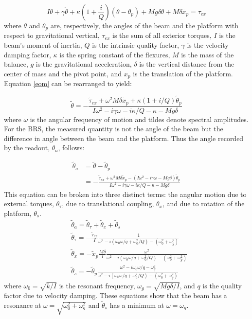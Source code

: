 \documentclass [12pt, proquest]{uwthesis}[2019]
\begin{document}
\begin{equation}
I \ddot{\theta}+ \gamma \dot{\theta}+\kappa (1+ \frac{i}{Q})(\theta-\theta_p)+M g \delta \theta +M \delta \ddot{x_p}=\tau_{ex} \label{eom}
\end{equation}
where $\theta$ and $\theta_p$ are, respectively, the angles of the beam and the platform with respect to gravitational vertical, $\tau_{ex}$ is the sum of all exterior torques, $I$ is the beam's moment of inertia, $Q$ is the intrinsic quality factor, $\gamma$ is the velocity damping factor, $\kappa$ is the spring constant of the flexures, $M$ is the mass of the balance, $g$ is the gravitational acceleration, $\delta$ is the vertical distance from the center of mass and the pivot point, and $x_p$ is the translation of the platform. Equation \ref{eom} can be rearranged to yield:

\begin{equation}
\tilde{\theta} = -\frac{\tilde{\tau}_{ex}+\omega^2 M \delta \tilde{x}_p+\kappa (1+i/Q) \tilde{\theta}_p}{I\omega^2-i \gamma \omega -i \kappa /Q-\kappa -Mg\delta}
\end{equation}
where $\omega$ is the angular frequency of motion and tildes denote spectral amplitudes. For the BRS, the measured quantity is not the angle of the beam but the difference in angle between the beam and the platform. Thus the angle recorded by the readout, $\theta_a$, follows:

\begin{align}
\tilde{\theta}_a &=\tilde{\theta}-\tilde{\theta}_p\\
&= -\frac{\tilde{\tau}_{ex}+\omega^2 M \delta \tilde{x}_p- (I\omega^2-i\gamma \omega -Mg\delta) \tilde{\theta}_p}{I\omega^2-i \gamma \omega -i \kappa /Q-\kappa -Mg\delta}
\end{align}
This equation can be broken into three distinct terms: the angular motion due to external torques, $\theta_\tau$, due to translational coupling, $\theta_x$, and due to rotation of the platform, $\theta_s$.
\begin{align}
&\tilde{\theta}_a =\tilde{\theta}_\tau+\tilde{\theta}_x+\tilde{\theta}_{s} \label{theta_A} \\ 
&\tilde{\theta}_\tau= -\frac{\tilde{\tau}_{ex}}{I}\frac{1}{\omega^2-i (\omega_0 \omega/q+\omega_0^2/Q)-(\omega_0^2+\omega_g^2)}\\
&\tilde{\theta}_x= -\tilde{x}_p\frac{M\delta}{I} \frac{\omega^2}{\omega^2-i (\omega_0 \omega/q+\omega_0^2/Q)-(\omega_0^2+\omega_g^2)}\\
&\tilde{\theta}_{s}= -\tilde{\theta}_p\frac{\omega^2-i\omega_0 \omega/q-\omega_g^2}{\omega^2-i (\omega_0 \omega/q+\omega_0^2/Q)-(\omega_0^2+\omega_g^2)}\label{theta_s}
\end{align}
where $\omega_0=\sqrt{k/I}$ is the resonant frequency, $\omega_g=\sqrt{M g \delta/I}$, and $q$ is the quality factor due to velocity damping. These equations show that the beam has a resonance at $\omega=\sqrt{\omega_0^2+\omega_g^2}$ and $\tilde{\theta}_s$ has a minimum at $\omega=\omega_g$. 
\end{document}
